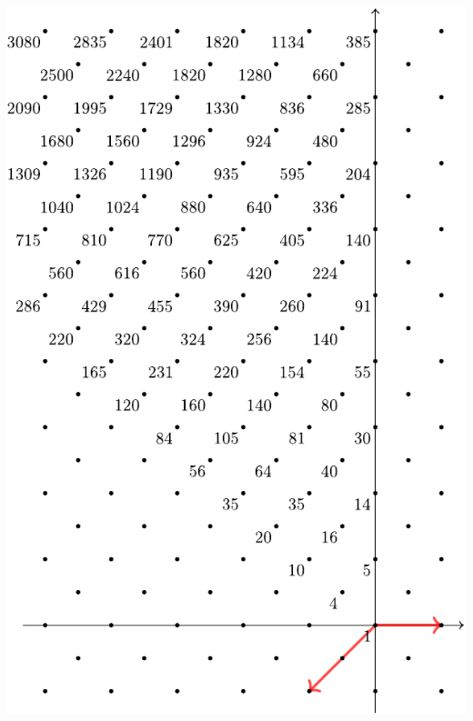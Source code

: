 \documentclass[11pt,oneside]{article}
\begin{document}
\begin{center}
\includegraphics[scale=0.6]{images/so5.pdf}
\end{center}
\end{document}

